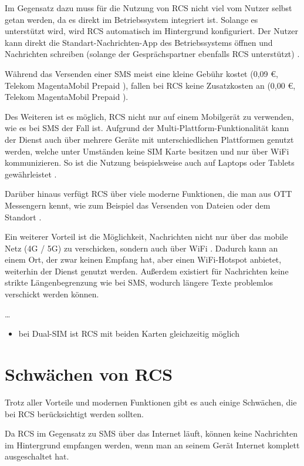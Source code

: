 \documentclass[conference]{IEEEtran}
\begin{document}
Im Gegensatz dazu muss für die Nutzung von RCS nicht viel vom Nutzer selbst getan werden, da es direkt im Betriebssystem integriert ist.
Solange es unterstützt wird, wird RCS automatisch im Hintergrund konfiguriert.
Der Nutzer kann direkt die Standart-Nachrichten-App des Betriebssystems öffnen und Nachrichten schreiben (solange der Gesprächspartner ebenfalls RCS unterstützt) \cite{5gmsg,rcsmno}.

Während das Versenden einer SMS meist eine kleine Gebühr kostet (0,09 €, Telekom MagentaMobil Prepaid \cite{telekomsms}), fallen bei RCS keine Zusatzkosten an (0,00 €, Telekom MagentaMobil Prepaid \cite{telekomrcs}).

Des Weiteren ist es möglich, RCS nicht nur auf einem Mobilgerät zu verwenden, wie es bei SMS der Fall ist.
Aufgrund der Multi-Plattform-Funktionalität kann der Dienst auch über mehrere Geräte mit unterschiedlichen Plattformen genutzt werden, welche unter Umständen keine SIM Karte besitzen und nur über WiFi kommunizieren.
So ist die Nutzung beispielsweise auch auf Laptops oder Tablets gewährleistet \cite{rcsmno,uniprof}.

Darüber hinaus verfügt RCS über viele moderne Funktionen, die man aus OTT Messengern kennt, wie zum Beispiel das Versenden von Dateien oder dem Standort \cite{wafaq,uniprof}.

Ein weiterer Vorteil ist die Möglichkeit, Nachrichten nicht nur über das mobile Netz (4G / 5G) zu verschicken, sondern auch über WiFi \cite{5gmsg}.
Dadurch kann an einem Ort, der zwar keinen Empfang hat, aber einen WiFi-Hotspot anbietet, weiterhin der Dienst genutzt werden.
Außerdem existiert für Nachrichten keine strikte Längenbegrenzung wie bei SMS, wodurch längere Texte problemlos verschickt werden können.

\dots

\begin{itemize}
    \item bei Dual-SIM ist RCS mit beiden Karten gleichzeitig möglich
\end{itemize}
\cite{uniprof}


\section{Schwächen von RCS}

Trotz aller Vorteile und modernen Funktionen gibt es auch einige Schwächen, die bei RCS berücksichtigt werden sollten.

Da RCS im Gegensatz zu SMS über das Internet läuft, können keine Nachrichten im Hintergrund empfangen werden, wenn man an seinem Gerät Internet komplett ausgeschaltet hat.
\end{document}

